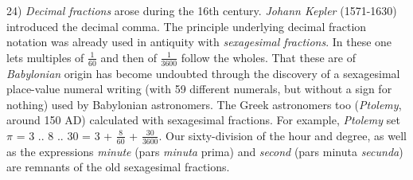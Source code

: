 \leftline{\rule{2in}{0.4pt}}
\vspace{0.1cm}
{
\footnotesize
24) \textit{Decimal fractions} arose during the 16th century. \textit{Johann Kepler} (1571-1630) introduced the decimal comma. The principle underlying decimal fraction notation was already used in antiquity with \textit{sexagesimal fractions}. In these one lets multiples of $\frac{1}{60}$ and then of $\frac{1}{3600}$ follow the wholes. That these are of \textit{Babylonian} origin has become undoubted through the discovery of a sexagesimal place-value numeral writing (with 59 different numerals, but without a sign for nothing) used by Babylonian astronomers. The Greek astronomers too (\textit{Ptolemy}, around 150 AD) calculated with sexagesimal fractions. For example, \textit{Ptolemy} set $\pi$ = 3 .. 8 .. 30 = 3 + $\frac{8}{60}$ + $\frac{30}{3600}$. Our sixty-division of the hour and degree, as well as the expressions \textit{minute} (pars \textit{minuta} prima) and \textit{second} (pars minuta \textit{secunda}) are remnants of the old sexagesimal fractions.

}
